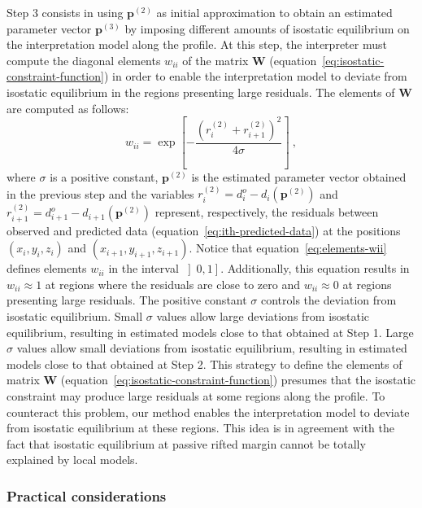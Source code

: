 \documentclass[manuscript]{geophysics}
\begin{document}
Step 3 consists in using $\mathbf{p}^{(2)}$ as initial approximation to
obtain an estimated parameter vector $\mathbf{p}^{(3)}$
by imposing different amounts of isostatic equilibrium on the interpretation model along the
profile. At this step, the interpreter must compute the diagonal elements 
$w_{ii}$ of the matrix $\mathbf{W}$ (equation~\ref{eq:isostatic-constraint-function}) 
in order to enable the interpretation model to deviate from isostatic equilibrium in 
the regions presenting large residuals. 
The elements of $\mathbf{W}$ are computed as follows:
\begin{equation} \label{eq:elements-wii}
w_{ii} = 
\exp \left[ - \frac{ \left( r_{i}^{(2)} + r_{i+1}^{(2)} \right)^{2}}{4 \sigma} \right] \: ,
\end{equation}
where $\sigma$ is a positive constant, $\mathbf{p}^{(2)}$ is the estimated parameter vector
obtained in the previous step and the variables
$r_{i}^{(2)} = d^{o}_{i} - d_{i} \left( \mathbf{p}^{(2)} \right)$ and 
$r_{i+1}^{(2)} = d^{o}_{i+1} - d_{i+1} \left(\mathbf{p}^{(2)} \right)$ represent,
respectively, the residuals between observed and predicted data
(equation~\ref{eq:ith-predicted-data}) at the positions $(x_{i}, y_{i}, z_{i})$ and 
$(x_{i+1}, y_{i+1}, z_{i+1})$. Notice that equation~\ref{eq:elements-wii} defines elements 
$w_{ii}$ in the interval $\left] 0, 1 \right]$. Additionally, this equation results in 
$w_{ii} \approx 1$ at regions where the residuals are close to zero and 
$w_{ii} \approx 0$ at regions presenting large residuals.
The positive constant $\sigma$ controls the deviation from isostatic equilibrium.
Small $\sigma$ values allow large deviations from isostatic equilibrium,
resulting in estimated models close to that obtained at Step 1.
Large $\sigma$ values allow small deviations from isostatic equilibrium,
resulting in estimated models close to that obtained at Step 2.
This strategy to define the elements of matrix $\mathbf{W}$ 
(equation~\ref{eq:isostatic-constraint-function}) presumes that the isostatic constraint may
produce large residuals at some regions along the profile. To counteract this problem,
our method enables the interpretation model to deviate from isostatic equilibrium at these 
regions. This idea is in agreement with the fact that isostatic equilibrium at 
passive rifted margin cannot be totally explained by local models.


\subsubsection*{Practical considerations}
\end{document}
